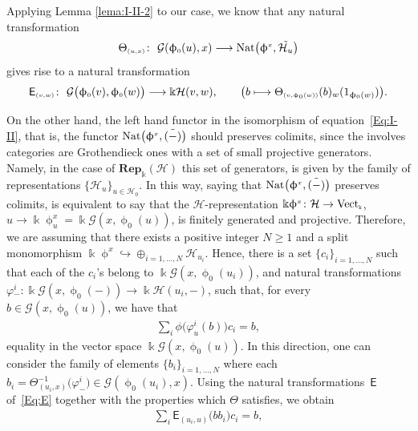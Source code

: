 \documentclass[pdftex]{sigma}
\numberwithin{equation}{section}
\newcommand{\Sf}[1]{\mathsf{#1}}
\newcommand{\Rep}[1]{\mathbf{Rep}_{\Sscript{\Bbbk}}(#1)}
\newcommand{\Vect}{{\rm Vect}_{\Sscript{\Bbbk}}}
\newcommand{\Ho}{\cH_{\Sscript{0}}}
\newcommand{\cG}{{\mathcal G}}
\newcommand{\cH}{{\mathcal H}}
\newcommand{\Sscript}[1]{\scriptscriptstyle{#1}}
\newcommand{\phio}{\upphi_{\Sscript{0}}}
\begin{document}
Applying Lemma \ref{lema:I-II-2} to our case, we know that any natural transformation
\begin{gather*}
\Theta_{\Sscript{(u,x)}}\colon \ \cG(\phio(u),x) \longrightarrow {\rm Nat}\big( \upphi^{\Sscript{x}}, \tilde{\cH_{u}}\big)
\end{gather*}
gives rise to a natural transformation
\begin{gather}\label{Eq:E}
{\sf{E}}_{\Sscript{(v,w)}}\colon \ \cG\big(\phio(v),\phio(w)\big) \longrightarrow \Bbbk\cH(v,w), \qquad \big( b \longmapsto \Theta_{\Sscript{(v,\phio(w))}}(b){}_{w}(1_{\phio(w)}) \big).
\end{gather}

On the other hand, the left hand functor in the isomorphism of equation~\eqref{Eq:I-II}, that is, the functor ${\rm Nat}\big(\upphi^{\Sscript{x}}, \tilde{(-)}\big)$ should preserves colimits, since the involves categories are Grothendieck ones with a set of small projective generators. Namely, in the case of $\Rep{\cH}$ this set of generators, is given by the family of representations $\{ \cH_{\Sscript{u}}\}_{\Sscript{u \in \Ho}}$. In this way, saying that ${\rm Nat}\big(\upphi^{\Sscript{x}}, \tilde{(-)}\big)$ preserves colimits, is equivalent to say that the $\cH$-representation $\Bbbk \upphi^{\Sscript{x}}\colon \cH \to \Vect$, $u \to \Bbbk \upphi^{\Sscript{x}}_{\Sscript{u}}=\Bbbk\cG(x,\phio(u))$, is finitely generated and projective. Therefore, we are assuming that there exists a positive integer $N \geq 1$ and a split monomorphism $\Bbbk \upphi^{\Sscript{x}} \hookrightarrow \oplus_{i =1,\dots, N} \cH_{\Sscript{u_{i}}}$. Hence, there is a set $\{ c_{i}\}_{\Sscript{i =1,\dots, N}}$ such that each of the $c_{i}$'s belong to $\Bbbk \cG(x, \phio(u_{i}))$, and natural transformations $\varphi{}^{i}_{-}\colon \Bbbk \cG(x,\phio(-)) \to \Bbbk \cH(u_{i},-)$, such that, for every $b \in \cG(x,\phio(u))$, we have that
\begin{gather*}
\sum_{i} \phi\big( \varphi^{i}_{u}(b) \big) c_{i} = b,
\end{gather*}
equality in the vector space $ \Bbbk\cG(x,\phio(u))$. In this direction, one can consider the family of elements $\{b_{i}\}_{\Sscript{i= 1,\dots, N}}$ where each $b_{i} = \Theta_{(u_{i}, x)}^{-1}\big( \varphi^{i}_{-}\big) \in \cG(\phio(u_{i}),x)$. Using the natural transformations~$\Sf{E}$ of~\eqref{Eq:E} together with the properties which $\Theta$ satisfies, we obtain
\begin{gather*}
\sum_{i} \Sf{E}_{\Sscript{(u_{i}, u)}} \big( bb_{i}\big) c_{i} = b,
\end{gather*}
\end{document}
